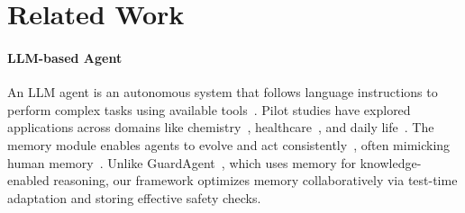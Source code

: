 \section{Related Work}
\paragraph{LLM-based Agent} An LLM agent is an autonomous system that follows language instructions to perform complex tasks using available tools~\cite{su2023language}. Pilot studies have explored applications across domains like chemistry~\cite{yu2024chemagent, Boiko2023, ghafarollahi2024protagentsproteindiscoverylarge}, healthcare~\cite{abbasian2024conversationalhealthagentspersonalized, shi2024ehragentcodeempowerslarge, yang2024psychogatnovelpsychologicalmeasurement}, and daily life~\cite{liu2023agentbench, zheng2023seeact, zhou2024webarenarealisticwebenvironment, gou2024navigatingdigitalworldhumans, gu2024llmsecretlyworldmodel}. The memory module enables agents to evolve and act consistently~\cite{Wang_2024}, often mimicking human memory~\cite{zhu2023ghostminecraftgenerallycapable, Zhu_2023, park2023generativeagentsinteractivesimulacra}. Unlike GuardAgent~\cite{xiang2024guardagentsafeguardllmagents}, which uses memory for knowledge-enabled reasoning, our framework optimizes memory collaboratively via test-time adaptation and storing effective safety checks.\par
